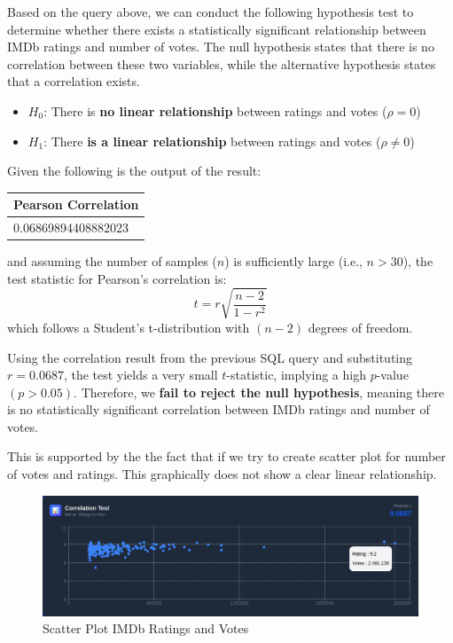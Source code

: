 Based on the query above, we can conduct the following hypothesis test to determine whether there exists a statistically significant relationship between IMDb ratings and number of votes. The null hypothesis states that there is no correlation between these two variables, while the alternative hypothesis states that a correlation exists.

\begin{itemize}
	\item $H_0$: There is \textbf{no linear relationship} between ratings and votes ($\rho = 0$)
	\item $H_1$: There \textbf{is a linear relationship} between ratings and votes ($\rho \neq 0$)
\end{itemize}

Given the following is the output of the result:

\begin{center}
	\begin{tabular}{|p{8cm}|}
		\hline
		Pearson Correlation \\
		\hline
		0.06869894408882023 \\
		\hline
	\end{tabular}
\end{center}

and assuming the number of samples ($n$) is sufficiently large (i.e., $n > 30$), the test statistic for Pearson’s correlation is:
\[
t = r \sqrt{\frac{n - 2}{1 - r^2}}
\]
which follows a Student’s t-distribution with $(n - 2)$ degrees of freedom.

Using the correlation result from the previous SQL query and substituting $r = 0.0687$, the test yields a very small $t$-statistic, implying a high $p$-value $(p > 0.05)$. Therefore, we \textbf{fail to reject the null hypothesis}, meaning there is no statistically significant correlation between IMDb ratings and number of votes.

This is supported by the the fact that if we try to create scatter plot for number of votes and ratings. This graphically does not show a clear linear relationship.

\begin{figure}[h!]
	\centering
	\includegraphics[width=0.7\linewidth]{images/image4.png}
	\caption{Scatter Plot IMDb Ratings and Votes}
\end{figure}




